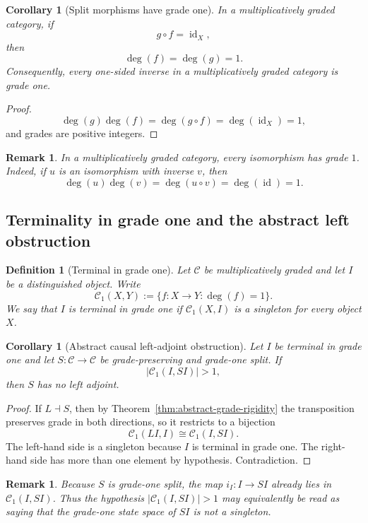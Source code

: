 \documentclass[11pt]{article}
\newtheorem{corollary}[theorem]{Corollary}
\newtheorem{definition}[theorem]{Definition}
\newtheorem{remark}[theorem]{Remark}
\DeclareMathOperator{\id}{id}
\begin{document}
\begin{corollary}[Split morphisms have grade one]
\label{cor:split-grade-one}
In a multiplicatively graded category, if
\[
g\circ f=\id_X,
\]
then
\[
\deg(f)=\deg(g)=1.
\]
Consequently, every one-sided inverse in a multiplicatively graded category
is grade one.
\end{corollary}

\begin{proof}
\[
\deg(g)\deg(f)=\deg(g\circ f)=\deg(\id_X)=1,
\]
and grades are positive integers.
\end{proof}

\begin{remark}
In a multiplicatively graded category, every isomorphism has grade $1$.
Indeed, if $u$ is an isomorphism with inverse $v$, then
\[
\deg(u)\deg(v)=\deg(u\circ v)=\deg(\id)=1.
\]
\end{remark}

\subsection{Terminality in grade one and the abstract left obstruction}

\begin{definition}[Terminal in grade one]
\label{def:terminal-grade-one}
Let $\mathcal C$ be multiplicatively graded and let $I$ be a distinguished
object. Write
\[
\mathcal C_1(X,Y):=\{f:X\to Y:\deg(f)=1\}.
\]
We say that $I$ is \emph{terminal in grade one} if
$\mathcal C_1(X,I)$ is a singleton for every object $X$.
\end{definition}

\begin{corollary}[Abstract causal left-adjoint obstruction]
\label{cor:abstract-left-obstruction}
Let $I$ be terminal in grade one and let
$S:\mathcal C\to\mathcal C$ be grade-preserving and grade-one split. If
\[
|\mathcal C_1(I,SI)|>1,
\]
then $S$ has no left adjoint.
\end{corollary}

\begin{proof}
If $L\dashv S$, then by Theorem~\ref{thm:abstract-grade-rigidity} the
transposition preserves grade in both directions, so it restricts to a
bijection
\[
\mathcal C_1(LI,I)\cong\mathcal C_1(I,SI).
\]
The left-hand side is a singleton because $I$ is terminal in grade one. The
right-hand side has more than one element by hypothesis. Contradiction.
\end{proof}

\begin{remark}
Because $S$ is grade-one split, the map $i_I:I\to SI$ already lies in
$\mathcal C_1(I,SI)$. Thus the hypothesis
$|\mathcal C_1(I,SI)|>1$ may equivalently be read as saying that the
grade-one state space of $SI$ is not a singleton.
\end{remark}
\end{document}
